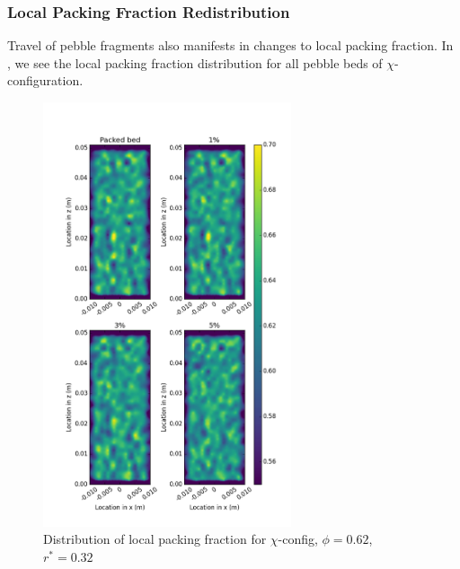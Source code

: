 \subsubsection{Local Packing Fraction Redistribution}
Travel of pebble fragments also manifests in changes to local packing fraction. In , we see the local packing fraction distribution for all pebble beds of $\chi$-configuration. 
\begin{figure}[!t]
    \centering
    \includegraphics[width = 0.65\textwidth]{figures/x-62-r23-1.png}
    \caption{Distribution of local packing fraction for $\chi$-config, $\phi = 0.62$, $r^* = 0.32$}\label{fig:x-62-r23}
\end{figure}

